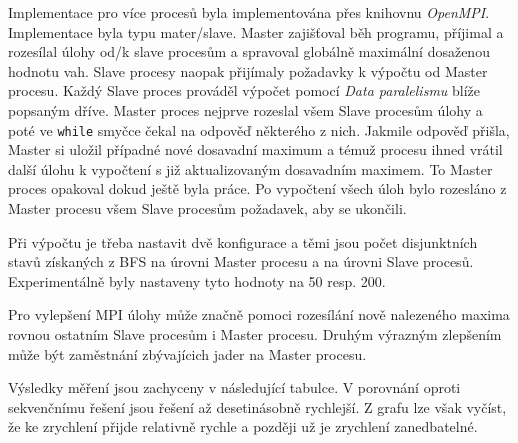 Implementace pro více procesů byla implementována přes knihovnu \textit{OpenMPI}.
Implementace byla typu mater/slave.
Master zajišťoval běh programu, příjimal a rozesílal úlohy od/k slave procesům a spravoval globálně maximální dosaženou hodnotu vah.
Slave procesy naopak přijímaly požadavky k výpočtu od Master procesu.
Každý Slave proces prováděl výpočet pomocí \textit{Data paralelismu} blíže popsaným dříve.
Master proces nejprve rozeslal všem Slave procesům úlohy a poté ve \verb|while| smyčce čekal na odpověď některého z nich. Jakmile odpověď přišla, Master si uložil případné nové dosavadní maximum
a témuž procesu ihned vrátil další úlohu k vypočtení s již aktualizovaným dosavadním maximem.
To Master proces opakoval dokud ještě byla práce.
Po vypočtení všech úloh bylo rozesláno z Master procesu všem Slave procesům požadavek, aby se ukončili.

Při výpočtu je třeba nastavit dvě konfigurace
a těmi jsou počet disjunktních stavů získaných z BFS na úrovni Master procesu a na úrovni Slave procesů.
Experimentálně byly nastaveny tyto hodnoty na 50 resp. 200.

Pro vylepšení MPI úlohy může značně pomoci rozesílání nově nalezeného maxima rovnou ostatním Slave procesům i Master procesu. Druhým výrazným zlepšením může být zaměstnání zbývajícich jader na Master procesu.

Výsledky měření jsou zachyceny v následující tabulce. 
V porovnání oproti sekvenčnímu řešení jsou řešení až desetinásobně rychlejší.
Z grafu lze však vyčíst, že ke zrychlení přijde relativně rychle
a později už je zrychlení zanedbatelné.

